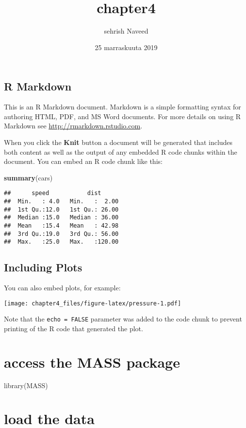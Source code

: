 \documentclass[]{article}
\title{chapter4}
\author{sehrish Naveed}
\date{25 marraskuuta 2019}
\newenvironment{Shaded}{\begin{snugshade}}{\end{snugshade}}
\newcommand{\KeywordTok}[1]{\textcolor[rgb]{0.13,0.29,0.53}{\textbf{#1}}}
\newcommand{\NormalTok}[1]{#1}
\begin{document}
\maketitle

\subsection{R Markdown}\label{r-markdown}

This is an R Markdown document. Markdown is a simple formatting syntax
for authoring HTML, PDF, and MS Word documents. For more details on
using R Markdown see \url{http://rmarkdown.rstudio.com}.

When you click the \textbf{Knit} button a document will be generated
that includes both content as well as the output of any embedded R code
chunks within the document. You can embed an R code chunk like this:

\begin{Shaded}
\begin{Highlighting}[]
\KeywordTok{summary}\NormalTok{(cars)}
\end{Highlighting}
\end{Shaded}

\begin{verbatim}
##      speed           dist       
##  Min.   : 4.0   Min.   :  2.00  
##  1st Qu.:12.0   1st Qu.: 26.00  
##  Median :15.0   Median : 36.00  
##  Mean   :15.4   Mean   : 42.98  
##  3rd Qu.:19.0   3rd Qu.: 56.00  
##  Max.   :25.0   Max.   :120.00
\end{verbatim}

\subsection{Including Plots}\label{including-plots}

You can also embed plots, for example:

\texttt{[image: chapter4\_files/figure-latex/pressure-1.pdf]}

Note that the \texttt{echo\ =\ FALSE} parameter was added to the code
chunk to prevent printing of the R code that generated the plot.

\section{access the MASS package}\label{access-the-mass-package}

library(MASS)

\section{load the data}\label{load-the-data}
\end{document}
